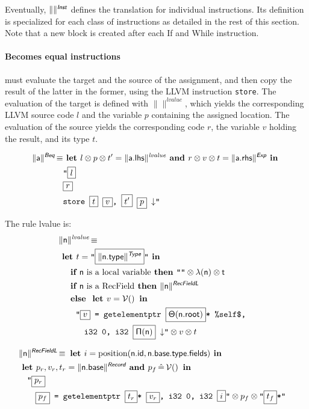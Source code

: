 \documentclass{article}
\newcommand{\trad}[2]{\ensuremath{\lVert \textsf{#1} \rVert^{\textit{#2}}}}
\newcommand{\nl}[0]{\ensuremath{\downarrow}}
\DeclareMathOperator{\isdef}{\equiv}
\DeclareMathOperator{\variable}{\mathcal{V}()}
\newcommand{\llvm}[1]{\texttt{#1}}
\newcommand{\B}[1]{\textsf{#1}}
\newcommand{\IF}[0]{\textbf{ if }}
\newcommand{\ELSE}[0]{\textbf{ else }}
\newcommand{\THEN}[0]{\textbf{ then }}
\newcommand{\LET}[0]{\textbf{ let }}
\DeclareMathOperator{\BE}{\hat{=}}
\newcommand{\IN}[0]{\textbf{ in }}
\newcommand{\AND}[0]{\textbf{ and }}
\newcommand{\PH}[1]{\framebox{$#1$}}
\newcommand{\sep}[0]{\otimes}
\newcommand{\local}[0]{\ensuremath{\sf\lambda}}
\newcommand{\idx}[0]{\ensuremath{\sf\Pi}}
\newcommand{\state}[0]{\ensuremath{\sf\Theta}}
\begin{document}
Eventually, $\trad{}{\B{Inst}}$ defines the translation for individual
instructions. Its definition is specialized for each class of instructions as
detailed in the rest of this section. Note that a new block is created after
each \B{If} and \B{While} instruction.

\paragraph{Becomes equal instructions} must evaluate the
 target and the source of the assignment, and then copy the result of the 
latter in the former, using the LLVM instruction \llvm{store}. The evaluation 
of the target is defined with $\trad{}{lvalue}$, which yields the corresponding 
LLVM source code $l$ and the variable $p$ containing the assigned location. The 
evaluation of the source yields the corresponding code $r$, the variable $v$ 
holding the result, and its type $t$.

\begin{align*}
\begin{split}
  \trad{a}{\B{Beq}} \isdef
  & \LET l \sep p \sep t'= \trad{a.lhs}{lvalue} \AND r \sep v \sep t = \trad{a.rhs}{\B{Exp}} \IN \\
  & \llvm{"\PH{l}} \\
  & \llvm{\PH{r}} \\
  & \llvm{store \PH{t} \PH{v}, \PH{t'} \PH{p} \nl"}
\end{split}
\end{align*}

The rule lvalue is:
\begin{align*}
\lefteqn{\trad{n}{lvalue} \isdef} \\
& \LET t = \llvm{"\PH{\trad{\B{n.type}}{\B{Type}}}"} \IN \\
& \quad \IF \mbox{\B{n} is a local variable} \THEN \llvm{""} \sep \local(\B{n}) \sep t \\
& \quad \IF \mbox{\B{n} is a RecField} \THEN  \trad{n}{\B{RecFieldL}} \\
& \quad \ELSE \LET v = \variable \IN \\
& \quad \quad \llvm{"\PH{v} = getelementptr \PH{\state(\B{n.root})}* \%self\$,} \\
& \quad \quad \quad \llvm{i32 0, i32 \PH{\idx(\B{n})} \nl"} \sep v \sep t
\end{align*}

\begin{align*}
\lefteqn{\trad{n}{\B{RecFieldL}} \isdef \LET i = \text{position}(\B{n.id}, \B{n.base.type.fields}) \IN} \\
& \LET p_r, v_r, t_r = \trad{\B{n.base}}{\B{Record}} \AND p_f \BE \variable \IN \\
& \quad \llvm{"\PH{p_r}} \\
& \quad \quad \llvm{\PH{p_f} = getelementptr \PH{t_r}* \PH{v_r}, i32 0, i32 \PH{i}"} \sep p_f \sep \llvm{"\PH{t_f}*"}
\end{align*}
\end{document}
